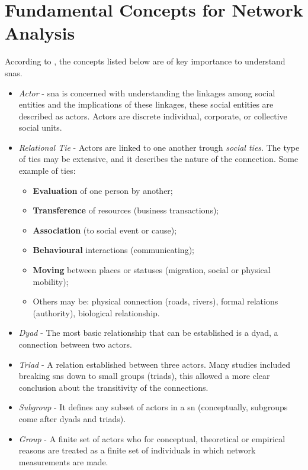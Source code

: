 \section{Fundamental Concepts for Network Analysis}

According to \cite{wasserman1994social}, the concepts listed below are of key importance to understand \glspl{sna}.

\begin{itemize}
    \item \emph{Actor} - \gls{sna} is concerned with understanding the linkages among social entities and the implications of these linkages, these social entities are described as actors. Actors are  discrete individual, corporate, or collective social units.
    \item \emph{Relational Tie} - Actors are linked to one another trough \textit{social ties}. The type of ties may be extensive, and it describes the nature of the connection. Some example of ties:
        \begin{itemize}
            \item \textbf{Evaluation} of one person by another;
            \item \textbf{Transference} of resources (business transactions);
            \item \textbf{Association} (to social event or cause);
            \item \textbf{Behavioural} interactions (communicating);
            \item \textbf{Moving} between places or statuses (migration, social or physical mobility);
            \item Others may be: physical connection (roads, rivers), formal relations (authority), biological relationship.
        \end{itemize}
    \item \emph{Dyad} - The most basic relationship that can be established is a dyad, a connection between two actors.
    \item \emph{Triad} - A relation established between three actors. Many studies included breaking \glspl{sn} down to small groups (triads), this allowed a more clear conclusion about the transitivity of the connections.
    \item \emph{Subgroup} - It defines any subset of actors in a \gls{sn} (conceptually, subgroups come after dyads and triads).
    \item \emph{Group} - A finite set of actors who for conceptual, theoretical or empirical reasons are treated as a finite set of individuals in which network measurements are made.

\end{itemize}
